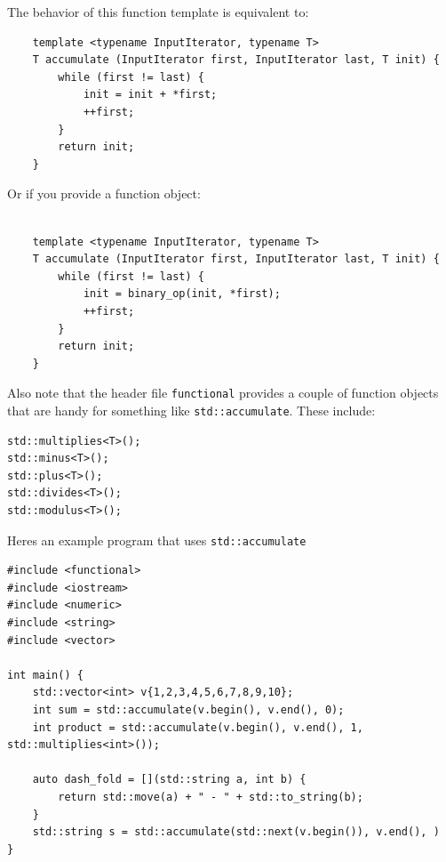 \documentclass{report}
\begin{document}
        \bigbreak \noindent
    The behavior of this function template is equivalent to:
    \begin{verbatim}
    template <typename InputIterator, typename T> 
    T accumulate (InputIterator first, InputIterator last, T init) {
        while (first != last) {
            init = init + *first;
            ++first;
        }
        return init;
    }
    \end{verbatim}
    Or if you provide a function object:
    \begin{verbatim}
     
    template <typename InputIterator, typename T> 
    T accumulate (InputIterator first, InputIterator last, T init) {
        while (first != last) {
            init = binary_op(init, *first);
            ++first;
        }
        return init;
    }
    \end{verbatim}
Also note that the header file \texttt{functional} provides a couple of function objects that are handy for something like \texttt{std::accumulate}. These include:
\begin{verbatim}
std::multiplies<T>();
std::minus<T>();
std::plus<T>();
std::divides<T>();
std::modulus<T>();
\end{verbatim}
\noindent Heres an example program that uses \texttt{std::accumulate}
\begin{verbatim}
#include <functional>
#include <iostream>
#include <numeric>
#include <string>
#include <vector>

int main() {
    std::vector<int> v{1,2,3,4,5,6,7,8,9,10};
    int sum = std::accumulate(v.begin(), v.end(), 0);
    int product = std::accumulate(v.begin(), v.end(), 1, std::multiplies<int>());

    auto dash_fold = [](std::string a, int b) {
        return std::move(a) + " - " + std::to_string(b);
    }
    std::string s = std::accumulate(std::next(v.begin()), v.end(), )
}
\end{verbatim}
\end{document}

